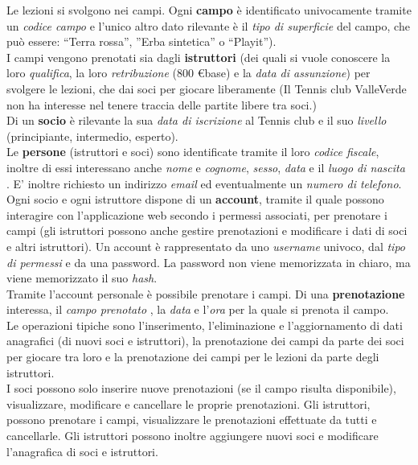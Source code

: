 Le lezioni si svolgono nei campi. Ogni \textbf{campo} è identificato univocamente tramite un \textit{codice campo} e l’unico altro dato rilevante è il \textit{tipo di superficie} del campo, che può essere: “Terra rossa”, ”Erba sintetica” o “Playit”). \\

I campi vengono prenotati sia dagli \textbf{istruttori} (dei quali si vuole conoscere la loro \textit{qualifica}, la loro \textit{retribuzione} (800 \euro base) e la \textit{data di assunzione}) per svolgere le lezioni, che dai soci per giocare liberamente (Il Tennis club ValleVerde non ha interesse nel tenere traccia delle partite libere tra soci.)\\

Di un \textbf{socio} è rilevante la sua \textit{data di iscrizione} al Tennis club e il suo \textit{livello} (principiante, intermedio, esperto).\\

Le \textbf{persone} (istruttori e soci) sono identificate tramite il loro \textit{codice fiscale}, inoltre di essi interessano anche \textit{nome} e \textit{cognome}, \textit{sesso}, \textit{data} e il \textit{luogo di nascita} . E’ inoltre richiesto un indirizzo \textit{email} ed eventualmente un \textit{numero di telefono}. \\

Ogni socio e ogni istruttore dispone di un \textbf{account}, tramite il quale possono interagire con l’applicazione web secondo i permessi associati, per prenotare i campi (gli istruttori possono anche gestire prenotazioni e modificare i dati di soci e altri istruttori).
Un account è rappresentato da uno \textit{username} univoco, dal \textit{tipo di permessi} e da una password. La password non viene memorizzata in chiaro, ma viene memorizzato il suo \textit{hash}.\\

Tramite l’account personale è possibile prenotare i campi. Di una \textbf{prenotazione} interessa, il \textit{campo prenotato} , la \textit{data} e l'\textit{ora} per la quale si prenota il campo. \\

Le operazioni tipiche sono l’inserimento, l’eliminazione e l’aggiornamento di dati anagrafici (di nuovi soci e istruttori), la prenotazione dei campi da parte dei soci per giocare tra loro e la prenotazione dei campi per le lezioni da parte degli istruttori. \\

I soci possono solo inserire nuove prenotazioni (se il campo risulta disponibile), visualizzare, modificare e cancellare le proprie prenotazioni. 
Gli istruttori, possono prenotare i campi, visualizzare le prenotazioni effettuate da tutti e cancellarle.
Gli istruttori possono inoltre aggiungere nuovi soci e modificare l’anagrafica di soci e istruttori.

